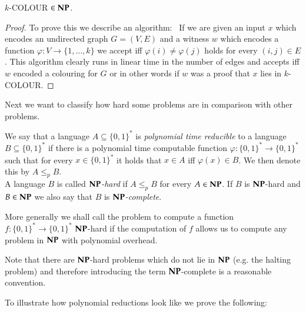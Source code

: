 \begin{Proposition}
 $k$-COLOUR $\in \mathbf{NP}$.
\end{Proposition}

\begin{proof}
 To prove this we describe an algorithm: \
 If we are given an input $x$ which encodes an undirected graph $G = (V,E)$ and a witness $w$ which encodes a 
 function $\varphi \colon V \to \lbrace 1, \dotsc, k \rbrace$ we accept iff $\varphi(i) \neq \varphi(j)$ holds
 for every $(i,j) \in E$ .
 This algorithm clearly runs in linear time in the number of edges and accepts iff $w$ encoded a  colouring for $G$ or in other words if
 $w$ was a proof that $x$ lies in $k$-COLOUR.
\end{proof}

Next we want to classify how hard some problems are in comparison with other problems.

\begin{Definition}
 We say that a language $A \subseteq {\lbrace 0,1 \rbrace}^*$ is \emph{polynomial time reducible} to a language 
 $B \subseteq {\lbrace 0,1 \rbrace}^*$ if there is a polynomial time computable function 
 ${\varphi \colon {\lbrace 0,1 \rbrace}^* \to {\lbrace 0,1 \rbrace}^*}$ such that for every $x \in {\lbrace 0,1 \rbrace}^*$ 
 it holds that $x \in A$ iff $\varphi (x) \in B$. We then denote this by $ A \leq_p B$. \\
 A language $B$ is called \emph{$\mathbf{NP}$-hard} if $A \leq_p B$ for every $A \in \mathbf{NP}$. If $B$ is $\mathbf{NP}$-hard
 and $B \in \mathbf{NP}$ we also say that $B$ is \emph{$\mathbf{NP}$-complete}.
\end{Definition}

\begin{Remark}
 More generally we shall call the problem to compute a function $f \colon {\lbrace 0,1 \rbrace}^* \to {\lbrace 0,1 \rbrace}^*$
 $\mathbf{NP}$-hard if the computation of $f$ allows us to compute any problem in $\mathbf{NP}$ with polynomial overhead.
\end{Remark}

\begin{Remark}
 Note that there are $\mathbf{NP}$-hard problems which do not lie in $\mathbf{NP}$ (e.g. the halting problem)
 and therefore introducing the term $\mathbf{NP}$-complete is a reasonable convention.
\end{Remark}


To illustrate how polynomial reductions look like we prove the following:

